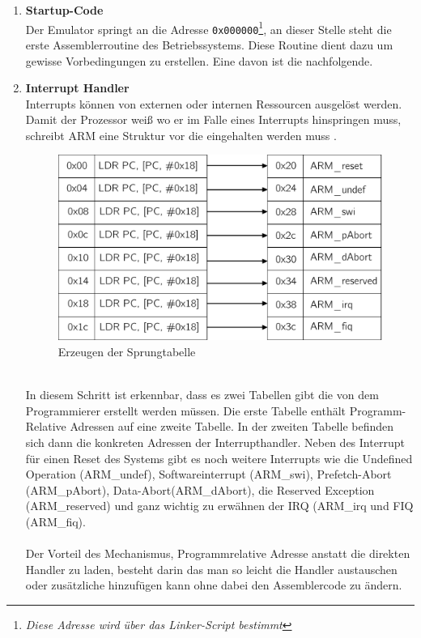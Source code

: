 	\begin{enumerate}
		\item{\textbf{Startup-Code}}\\
		 Der Emulator springt an die Adresse \texttt{0x000000}\footnote{\textit{Diese Adresse wird \"uber das Linker-Script bestimmt}}, an dieser Stelle steht die erste Assemblerroutine des Betriebssystems. Diese Routine dient dazu um gewisse Vorbedingungen zu erstellen. Eine davon ist die nachfolgende.
		 \item{\textbf{Interrupt Handler}}\\
		 \label{draft:exceptionHandler}
Interrupts k\"onnen von externen oder internen Ressourcen ausgel\"ost werden. Damit der Prozessor wei{\ss} wo er im Falle eines Interrupts hinspringen muss, schreibt ARM eine Struktur vor die eingehalten werden muss \parencite[vgl.][54]{archManI}. 
			\begin{figure}[h]
				\centering
					\includegraphics[scale=0.6]{common/exceptionhandler.pdf}
				\caption{Erzeugen der Sprungtabelle}
				\label{draft:excptionTable}
			\end{figure}\\
			In diesem Schritt ist erkennbar, dass es zwei Tabellen gibt die von dem Programmierer erstellt werden m\"ussen. Die erste Tabelle enth\"alt Programm-Relative Adressen auf eine zweite Tabelle. In der zweiten Tabelle befinden sich dann die konkreten Adressen der Interrupthandler. Neben des Interrupt f\"ur einen Reset des Systems gibt es noch weitere Interrupts wie die Undefined Operation (ARM\_undef), Softwareinterrupt (ARM\_swi), Prefetch-Abort (ARM\_pAbort), Data-Abort(ARM\_dAbort),  die Reserved Exception (ARM\_reserved) und ganz wichtig zu erw\"ahnen der IRQ (ARM\_irq und FIQ (ARM\_fiq).\\\\
Der Vorteil des Mechanismus, Programmrelative Adresse anstatt die direkten Handler zu laden, besteht darin das man so leicht die Handler austauschen oder zus\"atzliche hinzuf\"ugen kann ohne dabei den Assemblercode zu \"andern.\\

\end{enumerate}
